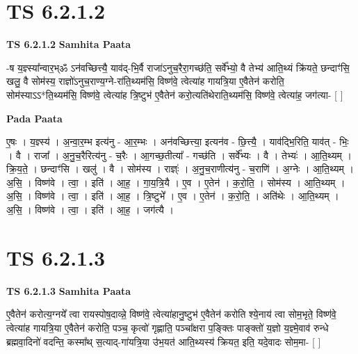 \documentclass[17pt]{extarticle}
\begin{document}
\section*{ TS 6.2.1.2 }

\textbf{TS 6.2.1.2 } \newline
\textbf{Samhita Paata} \newline

-ष य॒ज्ञ्स्या᳚न्वार॒भ्ॐ ऽन॑वच्छित्त्यै॒ याव॑द्-भि॒र्वै राजा॑ऽनुच॒रैरा॒गच्छ॑ति॒ सर्वे᳚भ्यो॒ वै तेभ्य॑ आति॒थ्यं क्रि॑यते॒ छन्दाꣳ॑सि॒ खलु॒ वै सोम॑स्य॒ राज्ञो॑ऽनुच॒राण्य॒ग्ने-रा॑ति॒थ्यम॑सि॒ विष्ण॑वे॒ त्वेत्या॑ह गायत्रि॒या ए॒वैतेन॑ करोति॒ सोम॑स्याऽऽ*ति॒थ्यम॑सि॒ विष्ण॑वे॒ त्वेत्या॑ह त्रि॒ष्टुभ॑ ए॒वैतेन॑ करो॒त्यति॑थेराति॒थ्यम॑सि॒ विष्ण॑वे॒ त्वेत्या॑ह॒ जग॑त्या- [  ] \newline

\textbf{Pada Paata} \newline

ए॒षः । य॒ज्ञ्स्य॑ । अ॒न्वा॒र॒म्भ इत्य॑नु -  आ॒र॒म्भः । अन॑वच्छित्त्या॒ इत्यन॑व - छि॒त्त्यै॒ । याव॑द्भि॒रिति॒ याव॑त् - भिः॒ । वै । राजा᳚ । अ॒नु॒च॒रैरित्य॑नु - च॒रैः । आ॒गच्छ॒तीत्या᳚ - गच्छ॑ति । सर्वे᳚भ्यः । वै । तेभ्यः॑ । आ॒ति॒थ्यम् । क्रि॒य॒ते॒ । छन्दाꣳ॑सि । खलु॑ । वै । सोम॑स्य । राज्ञ्ः॑ । अ॒नु॒च॒राणीत्य॑नु - च॒राणि॑ । अ॒ग्नेः । आ॒ति॒थ्यम् । अ॒सि॒ । विष्ण॑वे । त्वा॒ । इति॑ । आ॒ह॒ । गा॒य॒त्रि॒यै । ए॒व । ए॒तेन॑ । क॒रो॒ति॒ । सोम॑स्य । आ॒ति॒थ्यम् । अ॒सि॒ । विष्ण॑वे । त्वा॒ । इति॑ । आ॒ह॒ । त्रि॒ष्टुभे᳚ । ए॒व । ए॒तेन॑ । क॒रो॒ति॒ । अति॑थेः । आ॒ति॒थ्यम् । अ॒सि॒ । विष्ण॑वे । त्वा॒ । इति॑ । आ॒ह॒ । जग॑त्यै ।  \newline




\section*{ TS 6.2.1.3 }

\textbf{TS 6.2.1.3 } \newline
\textbf{Samhita Paata} \newline

ए॒वैतेन॑ करोत्य॒ग्नये᳚ त्वा रायस्पोष॒दाव्न्ने॒ विष्ण॑वे॒ त्वेत्या॑हानु॒ष्टुभ॑ ए॒वैतेन॑ करोति श्ये॒नाय॑ त्वा सोम॒भृते॒ विष्ण॑वे॒ त्वेत्या॑ह गायत्रि॒या ए॒वैतेन॑ करोति॒ पञ्च॒ कृत्वो॑ गृह्णाति॒ पञ्चा᳚क्षरा प॒ङ्क्तिः पाङ्क्तो॑ य॒ज्ञो य॒ज्ञ्मे॒वाव॑ रुन्धे ब्रह्मवा॒दिनो॑ वदन्ति॒ कस्मा᳚थ् स॒त्याद्-गा॑यत्रि॒या उ॑भ॒यत॑ आति॒थ्यस्य॑ क्रियत॒ इति॒ यदे॒वादः सोम॒मा- [  ] \newline
\end{document}
